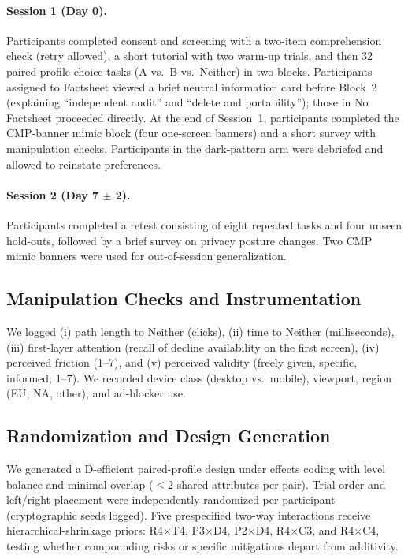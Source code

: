 \documentclass{eusset}
\begin{document}
\paragraph{Session 1 (Day 0).}
Participants completed consent and screening with a two-item comprehension check (retry allowed), a short tutorial with two warm-up trials, and then 32 paired-profile choice tasks (A vs.\ B vs.\ Neither) in two blocks. Participants assigned to Factsheet viewed a brief neutral information card before Block~2 (explaining ``independent audit'' and ``delete and portability''); those in No Factsheet proceeded directly. At the end of Session~1, participants completed the CMP-banner mimic block (four one-screen banners) and a short survey with manipulation checks. Participants in the dark-pattern arm were debriefed and allowed to reinstate preferences.

\paragraph{Session 2 (Day 7 $\pm$ 2).}
Participants completed a retest consisting of eight repeated tasks and four unseen hold-outs, followed by a brief survey on privacy posture changes. Two CMP mimic banners were used for out-of-session generalization.

\subsection{Manipulation Checks and Instrumentation}
We logged (i) path length to Neither (clicks), (ii) time to Neither (milliseconds), (iii) first-layer attention (recall of decline availability on the first screen), (iv) perceived friction (1--7), and (v) perceived validity (freely given, specific, informed; 1--7). We recorded device class (desktop vs.\ mobile), viewport, region (EU, NA, other), and ad-blocker use.

\subsection{Randomization and Design Generation}
We generated a D-efficient paired-profile design under effects coding with level balance and minimal overlap ($\le 2$ shared attributes per pair). Trial order and left/right placement were independently randomized per participant (cryptographic seeds logged). Five prespecified two-way interactions receive hierarchical-shrinkage priors: R4$\times$T4, P3$\times$D4, P2$\times$D4, R4$\times$C3, and R4$\times$C4, testing whether compounding risks or specific mitigations depart from additivity.
\end{document}
